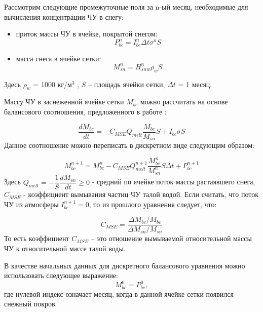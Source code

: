 \documentclass[a4paper, fontsize=14pt]{scrartcl}
\begin{document}
Рассмотрим следующие промежуточные поля за n-ый месяц, необходимые для вычисления концентрации ЧУ в снегу: 
\begin{itemize}
\begin{itemize}
    \item приток массы ЧУ в ячейке, покрытой снегом:
    \begin{equation}
        P_{bc}^n = I_{bc}^n \Delta t \sigma^n S   \label{sys}
    \end{equation}
    \item масса снега в ячейке сетки:
    \begin{equation}
        M_{sn}^n = H_{snw}^n \rho_w S   \label{sys}
    \end{equation}
\end{itemize} 
\end{itemize} 
Здесь $\rho_w$ = 1000 кг/м$^3$ , $S$ – площадь ячейки сетки, $\Delta t$ = 1 месяц.
    
Массу ЧУ в заснеженной ячейке сетки $M_{bc}$ можно рассчитать на основе балансового соотношения, предложенного в работе \cite{Flanner2007}:

\begin{equation}
    \dfrac{dM_{bc}}{dt} = - C_{MSE}  Q_{melt} \dfrac{M_{bc}}{M_{sn}} S + I_{bc} \sigma S     \label{sys}
\end{equation}
Данное соотношение можно переписать в дискретном виде следующим образом:

\begin{equation}
   M_{bc}^{n+1} = M_{bc}^n - C_{MSE} Q_{melt}^{n+1} \dfrac{M_{bc}^n}{M_{sn}^n} S \Delta t + P_{bc}^{n+1}     \label{sys}
\end{equation}
Здесь $Q_{melt} = - \dfrac{1}{S} \dfrac{dM_{sn}}{dt} \geq 0$ -  средний по ячейке поток массы растаявшего снега, $C_{MSE}$ - коэффициент вымывания частиц ЧУ талой водой. Если считать, что поток ЧУ из атмосферы $I_{bc}^{n + 1} = 0$, то из прошлого уравнения следует, что:

\begin{equation}
   C_{MSE} = \dfrac{\Delta M_{bc} / M_{bc}}{\Delta M_{sn} / M_{sn}}     \label{sys}
\end{equation}
То есть коэффициент $C_{MSE}$ – это отношение вымываемой относительной массы ЧУ к относительной
массе талой воды.

В качестве начальных данных для дискретного балансового уравнения можно использовать следующее выражение:
\begin{equation}
    M_{bc}^0 = P_{bc}^0, \label{sys}
\end{equation}
где нулевой индекс означает месяц, когда в данной ячейке сетки появился снежный покров. 
\end{document}
